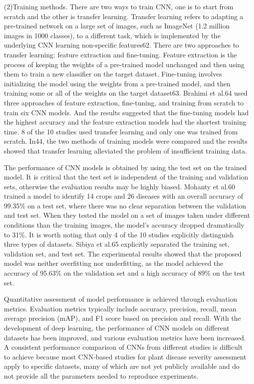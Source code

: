 (2)Training methods. There are two ways to train CNN, one is to start from scratch and the other is transfer learning. Transfer learning refers to adapting a pre-trained network on a large set of images, such as ImageNet (1.2 million images in 1000 classes), to a different task, which is implemented by the underlying CNN learning non-specific features62. There are two approaches to transfer learning: feature extraction and fine-tuning. Feature extraction is the process of keeping the weights of a pre-trained model unchanged and then using them to train a new classifier on the target dataset. Fine-tuning involves initializing the model using the weights from a pre-trained model, and then training some or all of the weights on the target dataset63. Brahimi et al.64 used three approaches of feature extraction, fine-tuning, and training from scratch to train six CNN models. And the results suggested that the fine-tuning models had the highest accuracy and the feature extraction models had the shortest training time. 8 of the 10 studies used transfer learning and only one was trained from scratch. In44, the two methods of training models were compared and the results showed that transfer learning alleviated the problem of insufficient training data.

The performance of CNN models is obtained by using the test set on the trained model. It is critical that the test set is independent of the training and validation sets, otherwise the evaluation results may be highly biased. Mohanty et al.60 trained a model to identify 14 crops and 26 diseases with an overall accuracy of 99.35\% on a test set, where there was no clear separation between the validation and test set. When they tested the model on a set of images taken under different conditions than the training images, the model’s accuracy dropped dramatically to 31\%. It is worth noting that only 4 of the 10 studies explicitly distinguish three types of datasets. Sibiya et al.65 explicitly separated the training set, validation set, and test set. The experimental results showed that the proposed model was neither overfitting nor underfitting, as the model achieved the accuracy of 95.63\% on the validation set and a high accuracy of 89\% on the test set.

Quantitative assessment of model performance is achieved through evaluation metrics. Evaluation metrics typically include accuracy, precision, recall, mean average precision (mAP), and F1 score based on precision and recall. With the development of deep learning, the performance of CNN models on different datasets has been improved, and various evaluation metrics have been increased. A consistent performance comparison of CNNs from different studies is difficult to achieve because most CNN-based studies for plant disease severity assessment apply to specific datasets, many of which are not yet publicly available and do not provide all the parameters needed to reproduce experiments.

